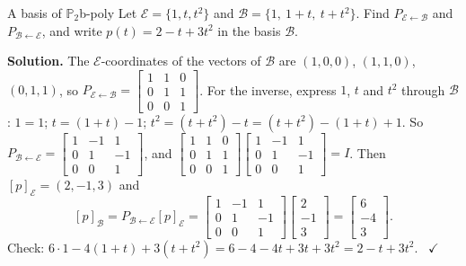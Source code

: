 \documentclass[11pt]{article}
\begin{document}
\begin{exmp}{A basis of $\mathbb{P}_2$}{b-poly}
Let $\mathcal{E}=\{1,t,t^2\}$ and $\mathcal{B}=\{1,\ 1+t,\ t+t^2\}$. Find $P_{\mathcal{E}\leftarrow\mathcal{B}}$ and $P_{\mathcal{B}\leftarrow\mathcal{E}}$, and write $p(t)=2-t+3t^2$ in the basis $\mathcal{B}$.

\textbf{Solution.} The $\mathcal{E}$-coordinates of the vectors of $\mathcal{B}$ are $(1,0,0)$, $(1,1,0)$, $(0,1,1)$, so $P_{\mathcal{E}\leftarrow\mathcal{B}}=\begin{bmatrix}1&1&0\\0&1&1\\0&0&1\end{bmatrix}$. For the inverse, express $1$, $t$ and $t^2$ through $\mathcal{B}$: $1=1$; $t=(1+t)-1$; $t^2=(t+t^2)-t=(t+t^2)-(1+t)+1$. So $P_{\mathcal{B}\leftarrow\mathcal{E}}=\begin{bmatrix}1&-1&1\\0&1&-1\\0&0&1\end{bmatrix}$, and $\begin{bmatrix}1&1&0\\0&1&1\\0&0&1\end{bmatrix}\begin{bmatrix}1&-1&1\\0&1&-1\\0&0&1\end{bmatrix}=I$. Then $[p]_{\mathcal{E}}=(2,-1,3)$ and
\[
[p]_{\mathcal{B}}=P_{\mathcal{B}\leftarrow\mathcal{E}}[p]_{\mathcal{E}}=\begin{bmatrix}1&-1&1\\0&1&-1\\0&0&1\end{bmatrix}\begin{bmatrix}2\\-1\\3\end{bmatrix}=\begin{bmatrix}6\\-4\\3\end{bmatrix}.
\]
Check: $6\cdot1-4(1+t)+3(t+t^2)=6-4-4t+3t+3t^2=2-t+3t^2$. \ $\checkmark$
\end{exmp}
\end{document}
